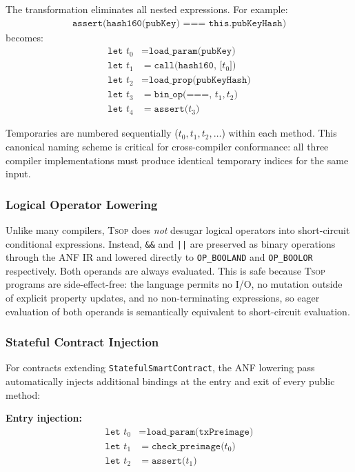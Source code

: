 \documentclass[11pt,a4paper]{article}
\newcommand{\op}[1]{\texttt{OP\_#1}}
\newcommand{\tsop}{\textsc{Tsop}}
\begin{document}
The transformation eliminates all nested expressions. For example:
\begin{align*}
  \texttt{assert(hash160(pubKey) === this.pubKeyHash)}
\end{align*}
becomes:
\begin{align*}
  \texttt{let } t_0 &= \texttt{load\_param(pubKey)} \\
  \texttt{let } t_1 &= \texttt{call(hash160, [}t_0\texttt{])} \\
  \texttt{let } t_2 &= \texttt{load\_prop(pubKeyHash)} \\
  \texttt{let } t_3 &= \texttt{bin\_op(===, }t_1, t_2\texttt{)} \\
  \texttt{let } t_4 &= \texttt{assert(}t_3\texttt{)}
\end{align*}

Temporaries are numbered sequentially ($t_0, t_1, t_2, \ldots$) within each
method. This canonical naming scheme is critical for cross-compiler
conformance: all three compiler implementations must produce identical
temporary indices for the same input.

\subsubsection{Logical Operator Lowering}

Unlike many compilers, \tsop{} does \emph{not} desugar logical operators
into short-circuit conditional expressions. Instead, \texttt{\&\&} and
\texttt{||} are preserved as binary operations through the ANF IR and
lowered directly to \op{BOOLAND} and \op{BOOLOR} respectively. Both
operands are always evaluated. This is safe because \tsop{} programs are
side-effect-free: the language permits no I/O, no mutation outside of
explicit property updates, and no non-terminating expressions, so eager
evaluation of both operands is semantically equivalent to short-circuit
evaluation.

\subsubsection{Stateful Contract Injection}

For contracts extending \texttt{StatefulSmartContract}, the ANF lowering
pass automatically injects additional bindings at the entry and exit of
every public method:

\textbf{Entry injection:}
\begin{align*}
  \texttt{let } t_0 &= \texttt{load\_param(txPreimage)} \\
  \texttt{let } t_1 &= \texttt{check\_preimage(}t_0\texttt{)} \\
  \texttt{let } t_2 &= \texttt{assert(}t_1\texttt{)}
\end{align*}
\end{document}
